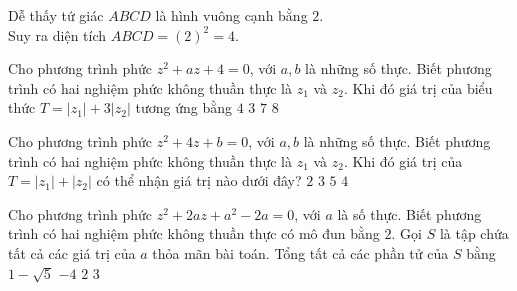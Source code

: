 \begin{ex}
\begin{ex}[2D4B4-3]
{ Dễ thấy tứ giác $A B C D$ là hình vuông cạnh bằng $2$.\\
Suy ra diện tích $A B C D=(2)^{2}=4$. 
}
\end{ex}
\begin{ex}[2D4K4-1]
Cho phương trình phức $z^2+a z+4=0$, với $a, b$ là những số thực. Biết phương trình có hai nghiệm phức không thuần thực là $z_1$ và $z_2$. Khi đó giá trị của biểu thức $T=\left|z_1\right|+3\left|z_2\right|$ tương ứng bằng
\choice
{$4$}
{$3$}
{$7$}
{\True$8$}
\end{ex}
\begin{ex}[2D4K4-1]
Cho phương trình phức $z^2+4 z+b=0$, với $a, b$ là những số thực. Biết phương trình có hai nghiệm phức không thuần thực là $z_1$ và $z_2.$ Khi đó giá trị của $T=\left|z_1\right|+\left|z_2\right|$ có thể nhận giá trị nào dưới đây?
\choice
{$2$}
{$3$}
{\True$5$}
{$4$}
\end{ex}
\begin{ex}[2D4K4-1]
Cho phương trình phức $z^2+2 a z+a^2-2 a=0$, với $a$ là số thực. Biết phương trình có hai nghiệm phức không thuần thực có mô đun bằng $2.$ Gọi $S$ là tập chứa tất cả các giá trị của $a$ thỏa mãn bài toán. Tổng tất cả các phần tử của $S$ bằng
\choice
{\True$1-\sqrt{5}$}
{$-4$}
{$2$}
{$3$}
\end{ex}
\end{ex}
